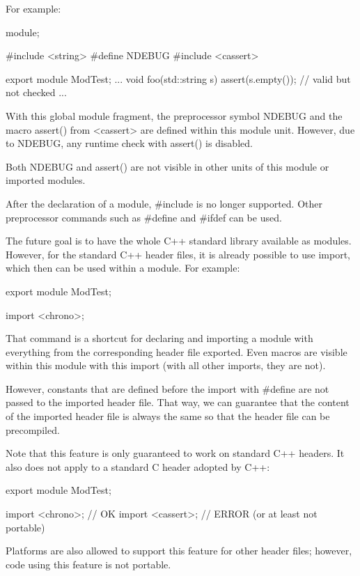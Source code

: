 For example:

\begin{cpp}
module;

#include <string>
#define NDEBUG
#include <cassert>

export module ModTest;
...
void foo(std::string s) {
	assert(s.empty()); // valid but not checked
	...
}
\end{cpp}

With this global module fragment, the preprocessor symbol NDEBUG and the macro assert() from <cassert> are defined within this module unit. However, due to NDEBUG, any runtime check with assert() is disabled.

Both NDEBUG and assert() are not visible in other units of this module or imported modules.

After the declaration of a module, \#include is no longer supported. Other preprocessor commands such as \#define and \#ifdef can be used.


The future goal is to have the whole C++ standard library available as modules. However, for the standard C++ header files, it is already possible to use import, which then can be used within a module. For example:

\begin{cpp}
export module ModTest;

import <chrono>;
\end{cpp}

That command is a shortcut for declaring and importing a module with everything from the corresponding header file exported. Even macros are visible within this module with this import (with all other imports, they are not).

However, constants that are defined before the import with \#define are not passed to the imported header file. That way, we can guarantee that the content of the imported header file is always the same so that the header file can be precompiled.

Note that this feature is only guaranteed to work on standard C++ headers. It also does not apply to a standard C header adopted by C++:

\begin{cpp}
export module ModTest;

import <chrono>; // OK
import <cassert>; // ERROR (or at least not portable)
\end{cpp}

Platforms are also allowed to support this feature for other header files; however, code using this feature is not portable.

